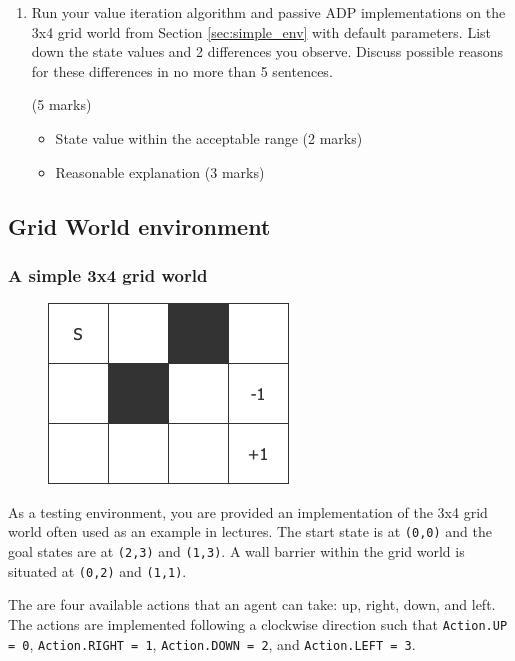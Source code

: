 \documentclass[12pt]{article}
\begin{document}
\begin{enumerate}
    \item Run your value iteration algorithm and passive ADP implementations on the 3x4 grid world from Section \ref{sec:simple_env} with default parameters. List down the state values and 2 differences you observe. Discuss possible reasons for these differences in no more than 5 sentences.
    \begin{markscheme} (5 marks)
        \begin{itemize}
            \item State value within the acceptable range (2 marks)
            \item Reasonable explanation (3 marks)
        \end{itemize}
    \end{markscheme}
    
\end{enumerate}

\subsection{Grid World environment} \label{sec:grid_world}

\subsubsection*{A simple 3x4 grid world} \label{sec:simple_env}

\begin{figure}[h]
    \centering
    \includegraphics[scale=0.65]{grid_world.png}
    \label{fig:grid_world}
\end{figure}

As a testing environment, you are provided an implementation of the 3x4 grid world often used as an example in lectures. The start state is at \texttt{(0,0)} and the goal states are at \texttt{(2,3)} and \texttt{(1,3)}. A wall barrier within the grid world is situated at \texttt{(0,2)} and \texttt{(1,1)}.

The are four available actions that an agent can take: up, right, down, and left. The actions are implemented following a clockwise direction such that \texttt{Action.UP = 0}, \texttt{Action.RIGHT = 1}, \texttt{Action.DOWN = 2}, and \texttt{Action.LEFT = 3}.
\end{document}
